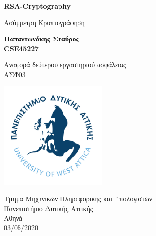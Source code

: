 %
%
%
\begin{titlepage}
	\begin{center}
		\vspace{1cm}	
		\Huge	
		\textbf{RSA-Cryptography}
		
		\vspace{0.5cm}
		\large
		Ασύμμετρη Κρυπτογράφηση
		
		\vspace{1.5cm}
		\textbf{Παπαντωνάκης Σταύρος\\ CSE45227}
		\vfill
		
		Αναφορά δεύτερου εργαστηριού ασφάλειας\\
		ΑΣΦ03
		\vspace{0.8cm}
		\begin{center}
			\includegraphics[width=0.4\textwidth]{image/logo.jpg}		
		\end{center}
		\normalsize
		Τμήμα Μηχανικών Πληροφορικής και Υπολογιστών\\
		Πανεπιστήμιο Δυτικής Αττικής\\
		Αθηνά\\
		03/05/2020\\	
	\end{center}
\end{titlepage}